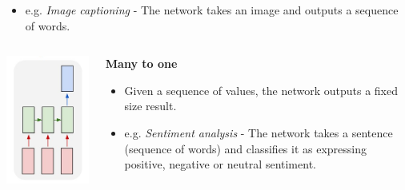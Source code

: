 \documentclass{beamer}
\begin{document}
\begin{frame}[allowframebreaks]
\begin{columns}
\begin{column}{0.7\textwidth}
\begin{itemize}
        \item e.g. \textit{Image captioning} - The network takes an image and outputs a sequence of words.
      \end{itemize}
    \end{column}
  \end{columns}
  \framebreak
  \begin{columns}
    \begin{column}{0.3\textwidth}
      \includegraphics[height=0.7\textheight]{../img/rnn-many-to-one.png}
    \end{column}
    \begin{column}{0.7\textwidth}
      \begin{center}
        \textbf{Many to one}
      \end{center}
      \begin{itemize}
        \item Given a sequence of values, the network outputs a fixed size result.
        \item e.g. \textit{Sentiment analysis} - The network takes a sentence (sequence of words) and classifies it as expressing positive, negative or neutral sentiment.
      \end{itemize}
    \end{column}
  \end{columns}
  \framebreak
  \begin{columns}
    \begin{column}{0.5\textwidth}

\end{column}
\end{columns}
\end{frame}
\end{document}
